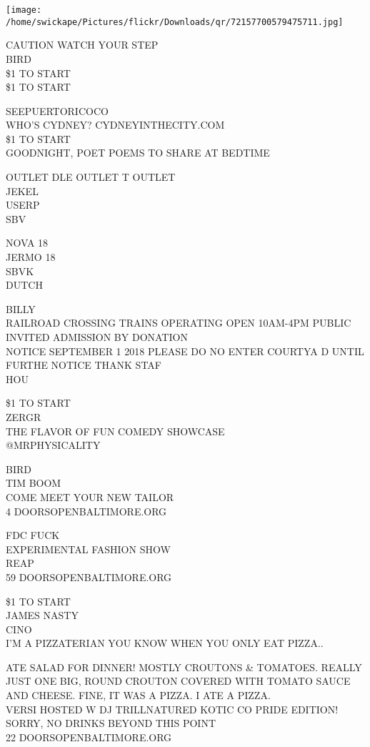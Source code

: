 \documentclass[10pt,letterpaper]{article}
\begin{document}
\texttt{[image: /home/swickape/Pictures/flickr/Downloads/qr/72157700579475711.jpg]}


CAUTION WATCH YOUR STEP\\
BIRD\\
\$1 TO START\\
\$1 TO START

SEEPUERTORICOCO\\
WHO'S CYDNEY?  CYDNEYINTHECITY.COM\\
\$1 TO START\\
GOODNIGHT, POET POEMS TO SHARE AT BEDTIME

OUTLET DLE OUTLET T OUTLET\\
JEKEL\\
USERP\\
SBV

NOVA 18\\
JERMO 18\\
SBVK\\
DUTCH

BILLY\\
RAILROAD CROSSING TRAINS OPERATING OPEN 10AM{-}4PM PUBLIC INVITED ADMISSION BY DONATION\\
NOTICE SEPTEMBER 1 2018 PLEASE DO NO ENTER COURTYA D UNTIL FURTHE NOTICE THANK STAF\\
HOU

\$1 TO START\\
ZERGR\\
THE FLAVOR OF FUN COMEDY SHOWCASE\\
@MRPHYSICALITY

BIRD\\
TIM BOOM\\
COME MEET YOUR NEW TAILOR\\
4 DOORSOPENBALTIMORE.ORG

FDC FUCK\\
EXPERIMENTAL FASHION SHOW\\
REAP\\
59 DOORSOPENBALTIMORE.ORG

\$1 TO START\\
JAMES NASTY\\
CINO\\
I'M A PIZZATERIAN YOU KNOW WHEN YOU ONLY EAT PIZZA..

ATE SALAD FOR DINNER!  MOSTLY CROUTONS \& TOMATOES.  REALLY JUST ONE BIG, ROUND CROUTON COVERED WITH TOMATO SAUCE AND CHEESE.  FINE, IT WAS A PIZZA.  I ATE A PIZZA.\\
VERSI HOSTED W DJ TRILLNATURED KOTIC CO PRIDE EDITION!\\
SORRY, NO DRINKS BEYOND THIS POINT\\
22 DOORSOPENBALTIMORE.ORG
\end{document}
